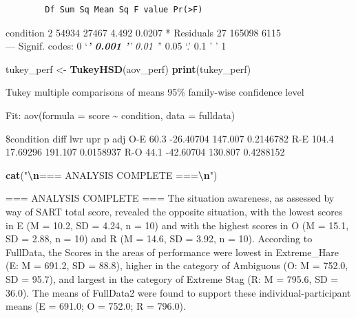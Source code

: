 \documentclass[
]{article}
\newenvironment{Shaded}{\begin{snugshade}}{\end{snugshade}}
\newcommand{\FunctionTok}[1]{\textcolor[rgb]{0.13,0.29,0.53}{\textbf{#1}}}
\newcommand{\NormalTok}[1]{#1}
\newcommand{\OtherTok}[1]{\textcolor[rgb]{0.56,0.35,0.01}{#1}}
\newcommand{\SpecialCharTok}[1]{\textcolor[rgb]{0.81,0.36,0.00}{\textbf{#1}}}
\newcommand{\StringTok}[1]{\textcolor[rgb]{0.31,0.60,0.02}{#1}}
\begin{document}
\begin{verbatim}
        Df Sum Sq Mean Sq F value Pr(>F)  
\end{verbatim}

condition 2 54934 27467 4.492 0.0207 * Residuals 27 165098 6115\\
--- Signif. codes: 0 `\emph{\textbf{' 0.001 '}' 0.01 '}' 0.05 `.' 0.1 '
' 1

\begin{Shaded}
\begin{Highlighting}[]
\NormalTok{tukey\_perf }\OtherTok{\textless{}{-}} \FunctionTok{TukeyHSD}\NormalTok{(aov\_perf)}
\FunctionTok{print}\NormalTok{(tukey\_perf)}
\end{Highlighting}
\end{Shaded}

Tukey multiple comparisons of means 95\% family-wise confidence level

Fit: aov(formula = score \textasciitilde{} condition, data = fulldata)

\$condition diff lwr upr p adj O-E 60.3 -26.40704 147.007 0.2146782 R-E
104.4 17.69296 191.107 0.0158937 R-O 44.1 -42.60704 130.807 0.4288152

\begin{Shaded}
\begin{Highlighting}[]
\FunctionTok{cat}\NormalTok{(}\StringTok{"}\SpecialCharTok{\textbackslash{}n}\StringTok{=== ANALYSIS COMPLETE ===}\SpecialCharTok{\textbackslash{}n}\StringTok{"}\NormalTok{)}
\end{Highlighting}
\end{Shaded}

=== ANALYSIS COMPLETE === The situation awareness, as assessed by way of
SART total score, revealed the opposite situation, with the lowest
scores in E (M = 10.2, SD = 4.24, n = 10) and with the highest scores in
O (M = 15.1, SD = 2.88, n = 10) and R (M = 14.6, SD = 3.92, n = 10).
According to FullData, the Scores in the areas of performance were
lowest in Extreme\_Hare (E: M = 691.2, SD = 88.8), higher in the
category of Ambiguous (O: M = 752.0, SD = 95.7), and largest in the
category of Extreme Stag (R: M = 795.6, SD = 36.0). The means of
FullData2 were found to support these individual-participant means (E =
691.0; O = 752.0; R = 796.0).
\end{document}
